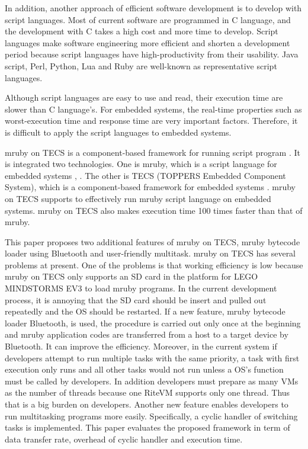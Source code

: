 \documentclass[conference,compsoc]{IEEEtran}
\begin{document}
In addition, another approach of efficient software development is to develop with script languages.
Most of current software are programmed in C language, and the development with C takes a high cost and more time to develop.
Script languages make software engineering more efficient and shorten a development period because script languages have high-productivity from their usability.
Java script, Perl, Python, Lua and Ruby are well-known as representative script languages.

Although script languages are easy to use and read, their execution time are slower than C language's.
For embedded systems, the real-time properties such as worst-execution time and response time are very important factors.
Therefore, it is difficult to apply the script languages to embedded systems.

mruby on TECS is a component-based framework for running script program \cite{par:mrubyonTECS}.
It is integrated two technologies.
One is mruby, which is a script language for embedded systems \cite{par:mruby}, \cite{url:mruby}.
The other is TECS (TOPPERS Embedded Component System), which is a component-based framework for embedded systems \cite{par:TECS} \cite{url:TOPPERS}.
mruby on TECS supports to effectively run mruby script language on embedded systems.
mruby on TECS also makes execution time 100 times faster than that of mruby.

This paper proposes two additional features of mruby on TECS, mruby bytecode loader using Bluetooth and user-friendly multitask.
mruby on TECS has several problems at present.
One of the problems is that working efficiency is low because mruby on TECS only supports an SD card in the platform for LEGO MINDSTORMS EV3 \cite{par:EV3} to load mruby programs.
In the current development process, it is annoying that the SD card should be insert and pulled out repeatedly and the OS should be restarted.
If a new feature, mruby bytecode loader Bluetooth, is used, the procedure is carried out only once at the beginning and mruby application codes are transferred from a host to a target device by Bluetooth.
It can improve the efficiency.
Moreover, in the current system if developers attempt to run multiple tasks with the same priority, a task with first execution only runs and all other tasks would not run unless a OS's function must be called by developers.
In addition developers must prepare as many VMs as the number of threads because one RiteVM supports only one thread.
Thus that is a big burden on developers.
Another new feature enables developers to run multitasking programs more easily.
Specifically, a cyclic handler of switching tasks is implemented.
This paper evaluates the proposed framework in term of data transfer rate, overhead of cyclic handler and execution time.
\end{document}
